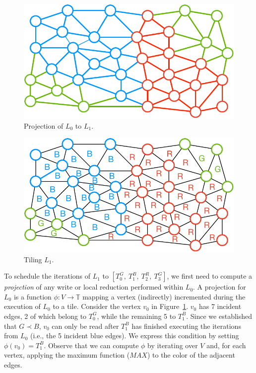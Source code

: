 \begin{figure}[h]
\centering
\includegraphics[scale=0.7]{sparsetiling/figures/loop_0_with_vertices.pdf}
\caption{Projection of $L_0$ to $L_1$.}
\label{fig:st-loop-0-proj}
\end{figure}

\begin{figure}[h]
\centering
\includegraphics[scale=0.7]{sparsetiling/figures/loop_1.pdf}
\caption{Tiling $L_1$.}
\label{fig:st-loop-1}
\end{figure}

To schedule the iterations of $L_1$ to $[T_0^G,\ T_1^B,\ T_2^R,\ T_3^G]$, we first need to compute a \textit{projection} of any write or local reduction performed within $L_0$.  A projection for $L_0$ is a function $\phi : V \rightarrow \mathbb{T}$ mapping a vertex (indirectly) incremented during the execution of $L_0$ to a tile. Consider the vertex $v_0$ in Figure~\ref{fig:st-loop-0-proj}. $v_0$ has 7 incident edges, 2 of which belong to $T_0^G$, while the remaining 5 to $T_1^B$. Since we established that $G \prec B$, $v_0$ can only be read after $T_1^B$ has finished executing the iterations from $L_0$ (i.e., the 5 incident blue edges). We express this condition by setting $\phi(v_0) = T_1^B$. Observe that we can compute $\phi$ by iterating over $V$ and, for each vertex, applying the maximum function ($MAX$) to the color of the adjacent edges. 

